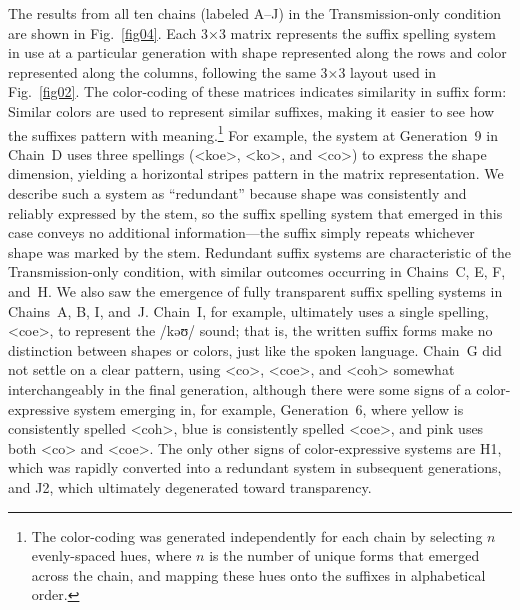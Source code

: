 \documentclass[doc,biblatex]{apa7}
\begin{document}
The results from all ten chains (labeled A--J) in the Transmission-only condition are shown in Fig.~\ref{fig04}. Each 3×3 matrix represents the suffix spelling system in use at a particular generation with shape represented along the rows and color represented along the columns, following the same 3×3 layout used in Fig.~\ref{fig02}. The color-coding of these matrices indicates similarity in suffix form: Similar colors are used to represent similar suffixes, making it easier to see how the suffixes pattern with meaning.\footnote{The color-coding was generated independently for each chain by selecting $n$ evenly-spaced hues, where $n$ is the number of unique forms that emerged across the chain, and mapping these hues onto the suffixes in alphabetical order.} For example, the system at Generation~9 in Chain~D uses three spellings (<koe>, <ko>, and <co>) to express the shape dimension, yielding a horizontal stripes pattern in the matrix representation. We describe such a system as ``redundant'' because shape was consistently and reliably expressed by the stem, so the suffix spelling system that emerged in this case conveys no additional information---the suffix simply repeats whichever shape was marked by the stem. Redundant suffix systems are characteristic of the Transmission-only condition, with similar outcomes occurring in Chains~C, E, F, and~H. We also saw the emergence of fully transparent suffix spelling systems in Chains~A, B, I, and~J. Chain~I, for example, ultimately uses a single spelling, <coe>, to represent the /kəʊ/ sound; that is, the written suffix forms make no distinction between shapes or colors, just like the spoken language. Chain~G did not settle on a clear pattern, using <co>, <coe>, and <coh> somewhat interchangeably in the final generation, although there were some signs of a color-expressive system emerging in, for example, Generation~6, where yellow is consistently spelled <coh>, blue is consistently spelled <coe>, and pink uses both <co> and <coe>. The only other signs of color-expressive systems are H1, which was rapidly converted into a redundant system in subsequent generations, and J2, which ultimately degenerated toward transparency.
\end{document}
